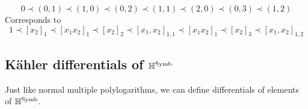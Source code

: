 \begin{example}
\[
0\prec(0,1)\prec(1,0)\prec(0,2)\prec(1,1)\prec(2,0)\prec(0,3)\prec(1,2)
\]
Corresponds to
\[
1\prec[x_2]_1\prec[x_1x_2]_1\prec[x_2]_2\prec[x_1,x_2]_{1,1}\prec[x_1x_2]_1\prec[x_2]_3\prec[x_1,x_2]_{1,2}
\]
\end{example}





\subsection{K\"ahler differentials of $\mathbb H^{\operatorname{Symb}}$}

Just like normal multiple polylogarithms, we can define differentials of elements of $\mathbb H^{\operatorname{Symb}}$.

